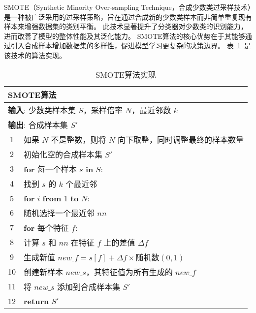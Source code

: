 SMOTE（Synthetic Minority Over-sampling Technique，合成少数类过采样技术）是一种被广泛采用的过采样策略，旨在通过合成新的少数类样本而非简单重复现有样本来增强数据集的类别平衡。
此技术显著提升了分类器对少数类的识别能力，进而改善了模型的整体性能及其泛化能力。
SMOTE算法的核心优势在于其能够通过引入合成样本增加数据集的多样性，促进模型学习更复杂的决策边界\cite{chawla2002smote}\cite{fernandez2018smote}。
表~\ref{tab:smote}~是该技术的算法实现。
\begin{table}[htbp]
  \caption{SMOTE算法实现}
  \label{tab:smote}
  \centering
  \begin{tabularx}{1.0\textwidth}{cl}
  \toprule
  \multicolumn{2}{l}{\textbf{SMOTE算法}}\\
  \midrule
  \multicolumn{2}{l}{\textbf{输入}: 少数类样本集 $S$，采样倍率 $N$，最近邻数 $k$} \\ 
  \multicolumn{2}{l}{\textbf{输出}: 合成样本集 $S'$} \\
  1& 如果 $N$ 不是整数，则将 $N$ 向下取整，同时调整最终的样本数量 \\
  2& 初始化空的合成样本集 $S'$ \\
  3& \textbf{for} 每一个样本 $s$ \textbf{in} $S$: \\
  4&\quad 找到 $s$ 的 $k$ 个最近邻 \\
  5&\quad \textbf{for} $i$ \textbf{from} 1 \textbf{to} $N$: \\
  6&\quad\quad 随机选择一个最近邻 $nn$ \\
  7&\quad\quad \textbf{for} 每个特征 $f$: \\
  8&\quad\quad\quad 计算 $s$ 和 $nn$ 在特征 $f$ 上的差值 $\Delta f$ \\
  9&\quad\quad\quad 生成新值 $new\_f = s[f] + \Delta f \times \text{随机数}(0, 1)$ \\
  10&\quad\quad 创建新样本 $new\_s$，其特征值为所有生成的 $new\_f$ \\
  11&\quad\quad 将 $new\_s$ 添加到合成样本集 $S'$ \\
  12&\textbf{return} $S'$ \\ 
  \bottomrule
  \end{tabularx}
\end{table}






